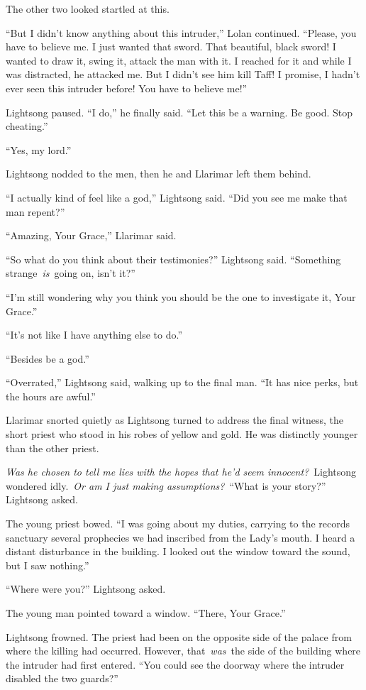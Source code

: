 The other two looked startled at this.

“But I didn’t know anything about this intruder,” Lolan continued. “Please, you have to believe me. I just wanted that sword. That beautiful, black sword! I wanted to draw it, swing it, attack the man with it. I reached for it and while I was distracted, he attacked me. But I didn’t see him kill Taff! I promise, I hadn’t ever seen this intruder before! You have to believe me!”

Lightsong paused. “I do,” he finally said. “Let this be a warning. Be good. Stop cheating.”

“Yes, my lord.”

Lightsong nodded to the men, then he and Llarimar left them behind.

“I actually kind of feel like a god,” Lightsong said. “Did you see me make that man repent?”

“Amazing, Your Grace,” Llarimar said.

“So what do you think about their testimonies?” Lightsong said. “Something strange~\textit{is}~going on, isn’t it?”

“I’m still wondering why you think you should be the one to investigate it, Your Grace.”

“It’s not like I have anything else to do.”

“Besides be a god.”

“Overrated,” Lightsong said, walking up to the final man. “It has nice perks, but the hours are awful.”

Llarimar snorted quietly as Lightsong turned to address the final witness, the short priest who stood in his robes of yellow and gold. He was distinctly younger than the other priest.

\textit{Was he chosen to tell me lies with the hopes that he’d seem innocent?}~Lightsong wondered idly.~\textit{Or am I just making assumptions?}~“What is your story?” Lightsong asked.

The young priest bowed. “I was going about my duties, carrying to the records sanctuary several prophecies we had inscribed from the Lady’s mouth. I heard a distant disturbance in the building. I looked out the window toward the sound, but I saw nothing.”

“Where were you?” Lightsong asked.

The young man pointed toward a window. “There, Your Grace.”

Lightsong frowned. The priest had been on the opposite side of the palace from where the killing had occurred. However, that~\textit{was}~the side of the building where the intruder had first entered. “You could see the doorway where the intruder disabled the two guards?”

